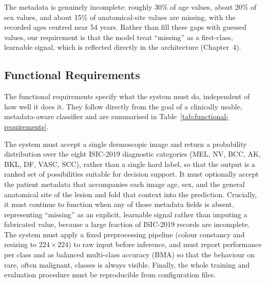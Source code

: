 The metadata is genuinely incomplete: roughly 30\% of age values, about 20\% of
sex values, and about 15\% of anatomical-site values are missing, with the
recorded ages centred near 54 years. Rather than fill these gaps with guessed
values, our requirement is that the model treat ``missing'' as a first-class,
learnable signal, which is reflected directly in the architecture (Chapter~4).

\subsection{Functional Requirements}

The functional requirements specify what the system must do, independent of
how well it does it. They follow directly from the goal of a clinically
usable, metadata-aware classifier and are summarised in
Table~\ref{tab:functional-requirements}.

The system must accept a single dermoscopic image and return a probability
distribution over the eight ISIC-2019 diagnostic categories (MEL, NV, BCC,
AK, BKL, DF, VASC, SCC), rather than a single hard label, so that the output
is a ranked set of possibilities suitable for decision support. It must
optionally accept the patient metadata that accompanies each image age,
sex, and the general anatomical site of the lesion and fold that context
into the prediction. Crucially, it must continue to function when any of
those metadata fields is absent, representing ``missing'' as an explicit,
learnable signal rather than imputing a fabricated value, because a large
fraction of ISIC-2019 records are incomplete. The system must apply a fixed
preprocessing pipeline (colour constancy and resizing to $224\times224$) to
raw input before inference, and must report performance per class and as
balanced multi-class accuracy (BMA) so that the behaviour on rare, often
malignant, classes is always visible. Finally, the whole training and
evaluation procedure must be reproducible from configuration files.

